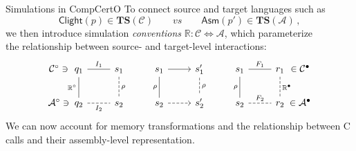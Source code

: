 \documentclass[aspectratio=1610,12pt]{beamer}
\begin{document}
\begin{frame}[fragile]{Simulations in CompCertO} %
  To connect source and target languages such as
  \[
    \mathsf{Clight}(p) \in \mathbf{TS}(\mathcal{C})
    \qquad
    \textit{vs}
    \qquad
    \mathsf{Asm}(p') \in \mathbf{TS}(\mathcal{A})
    \,,
  \]
  we then introduce simulation \emph{conventions} $\mathbb{R} : \mathcal{C} \Leftrightarrow \mathcal{A}$,
  which parameterize \\
  the relationship between source- and target-level interactions:
  \[
    \begin{tikzcd}
      \mathcal{C}^\circ \ni {} \hspace{-3em} &
      q_1 \ar[r, dash, "I_1"] \ar[d, "\mathbb{R}^\circ"', dash] & s_1 \ar[d, "\rho", dash, dashed] &
      s_1 \ar[r] \ar[d, dash, "\rho"'] & s_1' \ar[d, dashed, dash, "\rho"] &
      s_1 \ar[r, dash, "F_1"] \ar[d, dash, "\rho"'] & r_1 \ar[d, "\mathbb{R}^\bullet", dashed, dash]
      & \hspace{-3em} {} \in \mathcal{C}^\bullet
      \\
      \mathcal{A}^\circ \ni {} \hspace{-3em} &
      q_2 \ar[r, dash, dashed, "I_2"'] & s_2 &
      s_2 \ar[r, dashed] & s_2' & s_2 \ar[r, dashed, dash, "F_2"] & r_2
      & \hspace{-3em} {} \in \mathcal{A}^\bullet
    \end{tikzcd}
  \]
  We can now account for memory transformations and
  the relationship between C calls and their assembly-level representation.
\end{frame}
\end{document}
